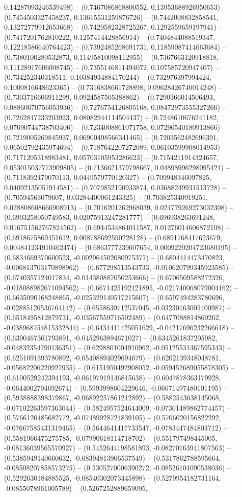 0.14287093246539498) -- (0.7467086868800552, 0.13953688926950653) -- (0.7454503327458237, 0.13615531259876726) -- (0.7442008832858541, 0.13272779912653668) -- (0.7429582328725267, 0.1292559659197941) -- (0.7417201762810222, 0.1257414428856914) -- (0.7404844088519347, 0.12218586640764423) -- (0.7392485268691731, 0.11859087414663684) -- (0.7380100280532873, 0.11495810098112955) -- (0.7367663120918818, 0.11128917606008745) -- (0.7355146811494072, 0.107585720947407) -- (0.734252340318511, 0.10384934884170244) -- (0.732976397994424, 0.1000816648623365) -- (0.7316838661728898, 0.09628426740014248) -- (0.7303716606911299, 0.0924587505388862) -- (0.7290366014506493, 0.08860670756053936) -- (0.7276754126805168, 0.08472973555327266) -- (0.7262847233203923, 0.08082944114504437) -- (0.7248610676241182, 0.07690744738703406) -- (0.7234008861071758, 0.07296540180913866) -- (0.7219005269845937, 0.06900498566341465) -- (0.7203562482696391, 0.06502792435974694) -- (0.7187642207272089, 0.06103599908014953) -- (0.7171205318983481, 0.05703105953286623) -- (0.7154211914324657, 0.053015037773909805) -- (0.7136621379798667, 0.04898996298095421) -- (0.7118392479070113, 0.0449579770120327) -- (0.709948346097825, 0.04092135051914581) -- (0.7079852190933874, 0.03688249931513728) -- (0.70594563079607, 0.03284400061243325) -- (0.703825340919251, 0.028808608666908913) -- (0.7016201262968039, 0.024779269273032308) -- (0.6993258050749583, 0.02075913247281777) -- (0.696938263691248, 0.016751562767824562) -- (0.6944534864011587, 0.01276014606872108) -- (0.6918675869451612, 0.008788692590228128) -- (0.6891768417623679, 0.004841234910462474) -- (0.6863777239607654, 0.0009220204723680195) -- (0.6834669370600523, -0.002964502080975377) -- (0.6804414473470823, -0.006813703170898962) -- (0.677298513543733, -0.010620799345923585) -- (0.6740357124017834, -0.014380887050253666) -- (0.6706509588272326, -0.018088982671094562) -- (0.6671425192121895, -0.021740068079004162) -- (0.6635090168248865, -0.025329140517215607) -- (0.6597494283780696, -0.02885126536764142) -- (0.6558630712537045, -0.03230163005400987) -- (0.6518495812879731, -0.03567559716502489) -- (0.6477088814860262, -0.038968754815332844) -- (0.6434411425051629, -0.04217696232266618) -- (0.6390467361793891, -0.0452963894671027) -- (0.6345261837205982, -0.04832354790136351) -- (0.6298801004910962, -0.05125531367595343) -- (0.6251091393780892, -0.05408894029694679) -- (0.6202139348048781, -0.05682206220927935) -- (0.6151950492908052, -0.059452689055878305) -- (0.6100529242394193, -0.06197919146815638) -- (0.6047878363179928, -0.0644002794692674) -- (0.5993998604229646, -0.06671497480101195) -- (0.5938888398379867, -0.06892257861212892) -- (0.5882543638145068, -0.07102263597363044) -- (0.5824957524644009, -0.07301489862774457) -- (0.5766120485682772, -0.07489928724839105) -- (0.5706020156822292, -0.07667585431319465) -- (0.5644641417733547, -0.0783447484803712) -- (0.5581966475275785, -0.07990618114718702) -- (0.551797498445005, -0.08136039565570927) -- (0.5452644198581893, -0.08270763941807563) -- (0.5385949140660632, -0.08394813906537549) -- (0.5317862788595664, -0.08508207858573275) -- (0.5305270006390272, -0.08526104090538036) -- (0.5292630184885525, -0.08540302073445898) -- (0.5279954182731164, -0.0855078961005789) -- (0.5267252889659095, 